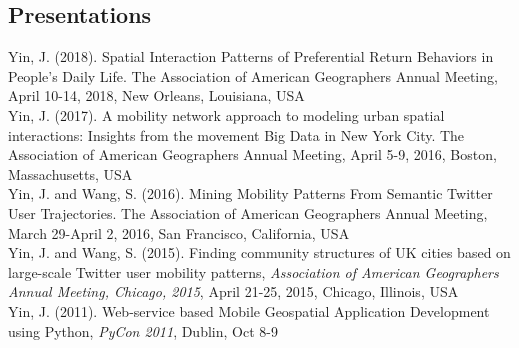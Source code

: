 \documentclass[11pt, a4paper]{article}
\newcommand{\years}[1]{\marginnote{\scriptsize #1}}
\begin{document}
\subsection*{Presentations}
\years{2018}Yin, J. (2018). Spatial Interaction Patterns of Preferential Return Behaviors in People’s Daily Life. The Association of American Geographers Annual Meeting, April 10-14, 2018, New Orleans, Louisiana, USA\\
\years{2017}Yin, J. (2017). A mobility network approach to modeling urban spatial interactions: Insights from the movement Big Data in New York City. The Association of American Geographers Annual Meeting, April 5-9, 2016, Boston, Massachusetts, USA\\
\years{2016}Yin, J. and Wang, S. (2016). Mining Mobility Patterns From Semantic Twitter User Trajectories. The Association of American Geographers Annual Meeting, March 29-April 2, 2016, San Francisco, California, USA\\
\years{2015}Yin, J. and Wang, S. (2015). Finding community structures of UK cities based on large-scale Twitter user mobility patterns, \textit{Association of American Geographers Annual Meeting, Chicago, 2015}, April 21-25, 2015, Chicago, Illinois, USA\\
\years{2011}Yin, J. (2011). Web-service based Mobile Geospatial Application Development using Python, \textit{PyCon 2011}, Dublin, Oct 8-9
\end{document}

